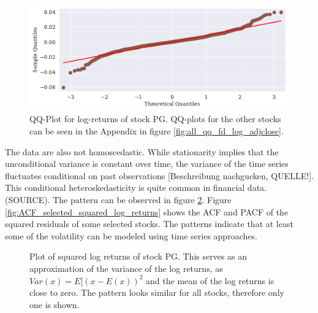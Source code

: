 \begin{figure}[h]
    \centering
    \begin{adjustbox}{width=.9\textwidth,center}
    \includegraphics[]{figures/PG_log_adjclose_fd_and_qq.pdf}
    \end{adjustbox}  
    \caption{QQ-Plot for log-returns of stock PG. QQ-plots for the other stocks can be seen in the Appendix in figure \ref{fig:all_qq_fd_log_adjclose}.}
    \label{fig:PG_qq_fd_log_adjclose}
\end{figure}{}

The data are also not homoscedastic. While stationarity implies that the unconditional variance is constant over time, the variance of the time series fluctuates conditional on past observations [Beschreibung nachgucken, QUELLE!]. This conditional heteroskedasticity is quite common in financial data. (SOURCE). The pattern can be observed in figure \ref{fig:PG_squared_log_returns}. Figure \ref{fig:ACF_selected_squared_log_returns} shows the ACF and PACF of the squared residuals of some selected stocks. The patterns indicate that at least some of the volatility can be modeled using time series approaches. 

\begin{figure}[h]
    \centering
    \begin{adjustbox}{width=.95\textwidth,center}
    
    \end{adjustbox}  
    \caption{Plot of squared log returns of stock PG. This serves as an approximation of the variance of the log returns, as $Var(x) = E [(x - E(x))^2$ and the mean of the log returns is close to zero. The pattern looks similar for all stocks, therefore only one is shown.}
    \label{fig:PG_squared_log_returns}
\end{figure}{}



